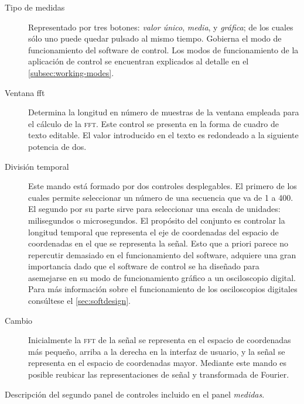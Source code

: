 \begin{table}
	\centering
	\begin{minipage}{.85\textwidth}
		\begin{description}
			\item[Tipo de medidas] Representado por tres
				botones: \emph{valor único}, \emph{media},
				y \emph{gráfica}; de los cuales sólo uno
				puede quedar pulsado al mismo tiempo.
				Gobierna el modo de funcionamiento del
				software de control. Los modos de
				funcionamiento de la aplicación de control
				se encuentran explicados al detalle en el
				\vref{subsec:working-modes}.
			\item[Ventana fft] Determina la longitud en número
				de muestras de la ventana empleada para el
				cálculo de la \textsc{fft}. Este control se
				presenta en la forma de cuadro de texto
				editable. El valor introducido en el texto
				es redondeado a la siguiente potencia de
				dos.
			\item[División temporal] Este mando está formado
				por dos controles desplegables. El primero
				de los cuales permite seleccionar un número
				de una secuencia que va de 1 a 400. El
				segundo por su parte sirve para seleccionar
				una escala de unidades: milisegundos o
				microsegundos. El propósito del conjunto es
				controlar la longitud temporal que
				representa el eje de coordenadas del
				espacio de coordenadas en el que se
				representa la señal. Esto que a priori
				parece no repercutir demasiado en el
				funcionamiento del software, adquiere una
				gran importancia dado que el software de
				control se ha diseñado para asemejarse en
				su modo de funcionamiento gráfico a un
				osciloscopio digital. Para más información
				sobre el funcionamiento de los
				osciloscopios digitales consúltese el
				\vref{sec:softdesign}.
			\item[Cambio] Inicialmente la \textsc{fft} de la
				señal se representa en el espacio de
				coordenadas más pequeño, arriba a la
				derecha en la interfaz de usuario, y la
				señal se representa en el espacio de
				coordenadas mayor. Mediante este mando es
				posible reubicar las representaciones de
				señal y transformada de Fourier.
		\end{description}
	\end{minipage}
	\caption[Descripción del segundo panel de controles]{Descripción
	del segundo panel de controles incluido en el panel
	\emph{medidas}.}
	\label{tab:second-panel}
\end{table}


